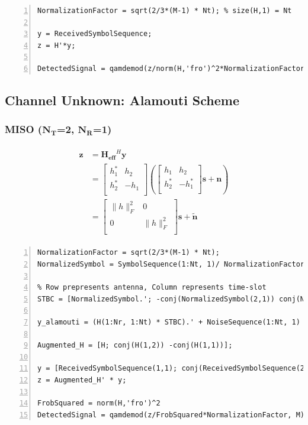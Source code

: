 \documentclass{article}
\begin{document}
\begin{lstlisting}[style=Matlab-editor, frame=single, numbers=left,]
NormalizationFactor = sqrt(2/3*(M-1) * Nt); % size(H,1) = Nt

y = ReceivedSymbolSequence;
z = H'*y;

DetectedSignal = qamdemod(z/norm(H,'fro')^2*NormalizationFactor, M);
\end{lstlisting}

\subsection{Channel Unknown: Alamouti Scheme}
\subsubsection[MISO ($N_T$=2, $N_R$=1)]{MISO ($\boldsymbol{N_T}$=2, $\boldsymbol{N_R}$=1)}
\begin{gather}
\begin{split}
\boldsymbol{z}&=\boldsymbol{H_{eff}}^H\boldsymbol{y}\\
&=
\begin{bmatrix}
h_1^* & h_2\\
h_2^* & -h_1\\
\end{bmatrix}
(
\begin{bmatrix}
h_1 & h_2\\
h_2^* & -h_1^*\\
\end{bmatrix}
\boldsymbol{s}+\boldsymbol{n})\\
&=
\begin{bmatrix}
\lVert h\rVert_F^2 & 0\\
0 & \lVert{h}\rVert_F^2\\
\end{bmatrix}
\boldsymbol{s}+\tilde{\boldsymbol{n}}
\end{split}
\end{gather}

\begin{lstlisting}[style=Matlab-editor, frame=single, numbers=left,]
NormalizationFactor = sqrt(2/3*(M-1) * Nt);
NormalizedSymbol = SymbolSequence(1:Nt, 1)/ NormalizationFactor;

% Row prepresents antenna, Column represents time-slot
STBC = [NormalizedSymbol.'; -conj(NormalizedSymbol(2,1)) conj(NormalizedSymbol(1,1))].';

y_alamouti = (H(1:Nr, 1:Nt) * STBC).' + NoiseSequence(1:Nt, 1) * sqrt(1 / EsN0(indx_EbN0));

Augmented_H = [H; conj(H(1,2)) -conj(H(1,1))];

y = [ReceivedSymbolSequence(1,1); conj(ReceivedSymbolSequence(2,1))];
z = Augmented_H' * y;

FrobSquared = norm(H,'fro')^2
DetectedSignal = qamdemod(z/FrobSquared*NormalizationFactor, M);
\end{lstlisting}
\end{document}
